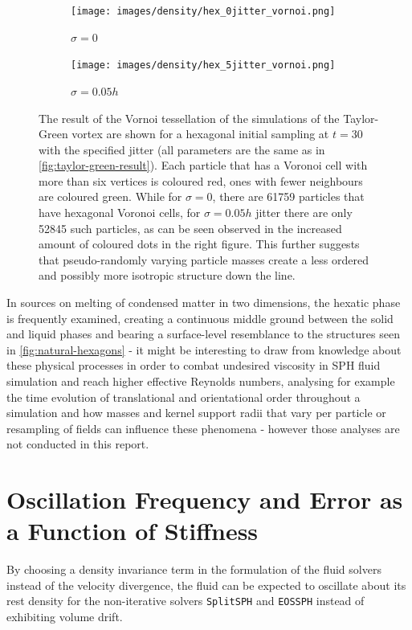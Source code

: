 \begin{figure}
  \begin{subfigure}[t]{0.49\textwidth}
    \texttt{[image: images/density/hex\_0jitter\_vornoi.png]}
    \caption{$\sigma=0$}
  \end{subfigure}
  \begin{subfigure}[t]{0.49\textwidth}
    \texttt{[image: images/density/hex\_5jitter\_vornoi.png]}
    \caption{$\sigma=0.05h$}
  \end{subfigure}
  \caption{The result of the Vornoi tessellation of the simulations of the Taylor-Green vortex are shown for a hexagonal initial sampling at $t=30$ with the specified jitter (all parameters are the same as in \autoref{fig:taylor-green-result}). Each particle that has a Voronoi cell with more than six vertices is coloured red, ones with fewer neighbours are coloured green. While for  $\sigma=0$, there are 61759 particles that have hexagonal Voronoi cells, for $\sigma=0.05h$ jitter there are only 52845 such particles, as can be seen observed in the increased amount of coloured dots in the right figure. This further suggests that pseudo-randomly varying particle masses create a less ordered and possibly more isotropic structure down the line.}
  \label{fig:jitter-vornoi-tesselation}
\end{figure}

In sources on melting of condensed matter in two dimensions, the hexatic phase is frequently examined, creating a continuous middle ground between the solid and liquid phases and bearing a surface-level resemblance to the structures seen in \autoref{fig:natural-hexagons} - it might be interesting to draw from knowledge about these physical processes in order to combat undesired viscosity in SPH fluid simulation and reach higher effective Reynolds numbers, analysing for example the time evolution of translational and orientational order throughout a simulation and how masses and kernel support radii that vary per particle or resampling of fields can influence these phenomena - however those analyses are not conducted in this report.


\newpage
\section{Oscillation Frequency and Error as a Function of Stiffness}\label{sec:oscillations}
By choosing a density invariance term in the formulation of the fluid solvers instead of the velocity divergence, the fluid can be expected to oscillate about its rest density for the non-iterative solvers \texttt{SplitSPH} and \texttt{EOSSPH} instead of exhibiting volume drift.


